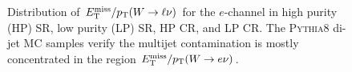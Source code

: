 \begin{figure}[htb]
\caption[Distribution of $\MET/\pT(W\ra e\nu)$ including a di-jet Monte Carlo sample]{Distribution of $E_{\text{T}}^{\text{miss}}/p_{\text{T}}(W\rightarrow\ell\nu)$ for the $e$-channel in \protect{} high purity (HP) SR, \protect{} low purity (LP) SR, \protect{} HP \Wjets CR, and \protect{} LP \Wjets CR. The \textsc{Pythia8} di-jet MC samples verify the multijet contamination is mostly concentrated in the region $\MET/\pT(W\ra e\nu)$. }
\label{fig:metpt_el}
\end{figure}
\begin{figure}[h!tb]
\centering
{}
\\

\end{figure}
